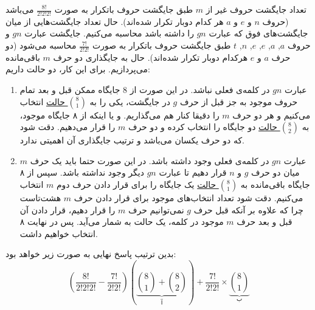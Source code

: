 \p
تعداد جایگشت حروف غیر از $m$
طبق جایگشت حروف باتکرار به صورت 
$\frac{8!}{2!2!2!}$
می‌باشد
(حروف $n$ و $e$ و $a$ هر کدام دوبار تکرار شده‌اند).
 حال تعداد جایگشت‌هایی از میان جایگشت‌های فوق که عبارت
 $gn$ 
را داشته باشد محاسبه می‌کنیم. جایگشت عبارت
  $gn$
  و حروف
  $a$, 
  $a$, 
  $e$, 
  $e$, 
  $n$, 
  $t$
  طبق جایگشت حروف باتکرار به صورت    
  $\frac{7!}{2!2!}$
  محاسبه می‌شود 
(دو حرف $a$ و $e$ هرکدام دوبار تکرار شده‌اند).
حال به جایگذاری دو حرف $m$ باقی‌مانده می‌پردازیم. برای این کار، دو حالت داریم:
\begin{enumerate}
  \item 
  عبارت $gn$ در کلمه‌ی فعلی نباشد.
 در این صورت از 8 جایگاه ممکن 
  قبل و بعد تمام حروف موجود به جز قبل از حرف $g$ در جایگشت، 
یکی را به 
\underline{${8\choose 1}$ حالت}
 انتخاب می‌کنیم و هر دو حرف $m$ را دقیقا کنار هم می‌گذاریم.
 و یا اینکه از ۸ جایگاه موجود، به 
\underline{${8\choose 2}$ حالت}
دو جایگاه را انتخاب کرده و دو حرف
 $m$
 را قرار می‌دهیم.
دقت شود که دو حرف یکسان می‌باشد و ترتیب جایگذاری آن اهمیتی ندارد.

  \item
  عبارت $gn$ در کلمه‌ی فعلی وجود داشته ‌باشد.
  در این صورت حتما باید یک حرف $m$ میان دو حرف 
  $g$ و $n$ قرار دهیم تا عبارت $gn$ دیگر وجود نداشته باشد.
  سپس از ۸ جایگاه باقی‌مانده به 
  \underline{${8\choose 1}$ حالت}
  یک جایگاه را برای قرار دادن حرف دوم $m$ انتخاب می‌کنیم. دقت شود تعداد انتخاب‌های موجود برای قرار دادن حرف $m$ هشت‌تاست چرا که علاوه بر آنکه قبل حرف $g$ نمی‌توانیم حرف $m$ را قرار دهیم، قرار دادن آن قبل و بعد حرف $m$ موجود در کلمه، یک حالت به شمار می‌آید. پس در نهایت ۸ انتخاب خواهیم داشت.
  
\end{enumerate}
\p
بدین ترتیب پاسخ نهایی به صورت زیر خواهد بود:
$$(\frac{8!}{2!2!2!} - \frac{7!}{2!2!})(\underbrace{{8\choose 1} + {8\choose 2}}_{\text{آ}}) + \frac{7!}{2!2!} \times \underbrace{{8\choose 1}}_{\text{ب}}$$
